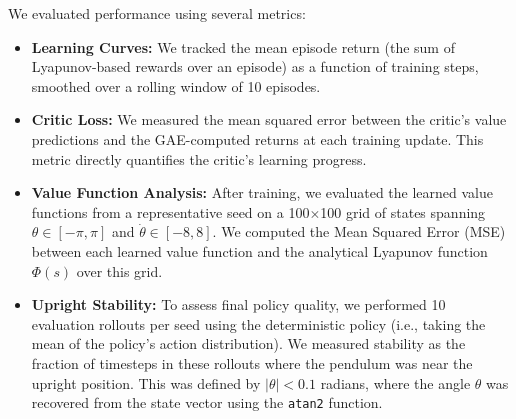 \documentclass[]{article}
\begin{document}
We evaluated performance using several metrics:
\begin{itemize}
    \item \textbf{Learning Curves:} We tracked the mean episode return (the sum of Lyapunov-based rewards over an episode) as a function of training steps, smoothed over a rolling window of 10 episodes.
    \item \textbf{Critic Loss:} We measured the mean squared error between the critic's value predictions and the GAE-computed returns at each training update. This metric directly quantifies the critic's learning progress.
    \item \textbf{Value Function Analysis:} After training, we evaluated the learned value functions from a representative seed on a 100$\times$100 grid of states spanning $\theta \in [-\pi, \pi]$ and $\dot\theta \in [-8, 8]$. We computed the Mean Squared Error (MSE) between each learned value function and the analytical Lyapunov function $\Phi(s)$ over this grid.
    \item \textbf{Upright Stability:} To assess final policy quality, we performed 10 evaluation rollouts per seed using the deterministic policy (i.e., taking the mean of the policy's action distribution). We measured stability as the fraction of timesteps in these rollouts where the pendulum was near the upright position. This was defined by $|\theta| < 0.1$ radians, where the angle $\theta$ was recovered from the state vector using the \texttt{atan2} function.
\end{itemize}
\end{document}
